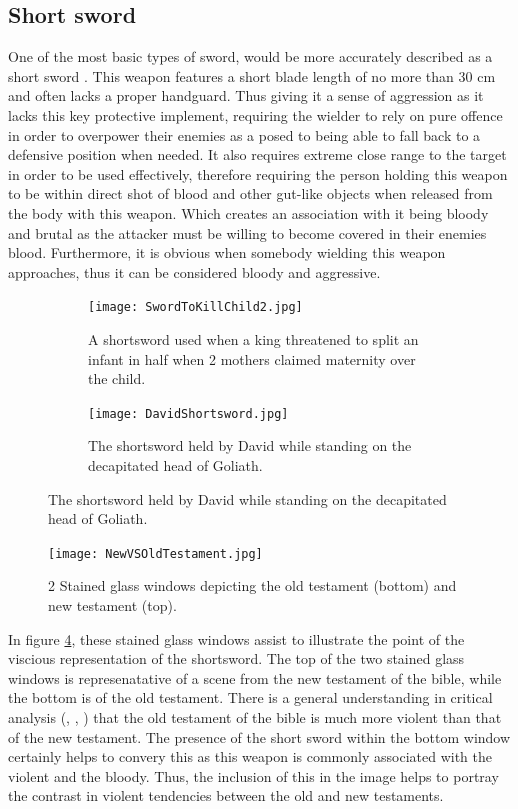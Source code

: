 \documentclass{article}
\begin{document}
\subsection{Short sword} \label{shortSwordSymbol}
One of the most basic types of sword, would be more accurately described as a short sword \parencite{mcnab2010swords}. This weapon features a short blade length of no more than 30 cm and often lacks a proper handguard. Thus giving it a sense of aggression as it lacks this key protective implement, requiring the wielder to rely on pure offence in order to overpower their enemies as a posed to being able to fall back to a defensive position when needed. It also requires extreme close range to the target in order to be used effectively, therefore requiring the person holding this weapon to be within direct shot of blood and other gut-like objects when released from the body with this weapon. Which creates an association with it being bloody and brutal as the attacker must be willing to become covered in their enemies blood. Furthermore, it is obvious when somebody wielding this weapon approaches, thus it can be considered bloody and aggressive.

\begin{figure}[h]
    \centering
    \caption{A collection of shortswords being used in brutish circumstances}
    \begin{subfigure}{0.3\textwidth}
        \texttt{[image: SwordToKillChild2.jpg]}
        \caption{A shortsword used when a king threatened to split an infant in half when 2 mothers claimed maternity over the child.}
        \label{fig:killChild}
    \end{subfigure}
    \begin{subfigure}{0.3\textwidth}
        \texttt{[image: DavidShortsword.jpg]}
        \caption{The shortsword held by David while standing on the decapitated head of Goliath.}
        \label{fig:goliathDead}
    \end{subfigure}
    \label{fig:shortswords}
\end{figure}

\begin{figure}[H]
    \centering
    \texttt{[image: NewVSOldTestament.jpg]}
    \caption{2 Stained glass windows depicting the old testament (bottom) and new testament (top).}
    \label{fig:shortswordsTestament}
\end{figure}

In figure \ref{fig:shortswordsTestament}, these stained glass windows assist to illustrate the point of the viscious representation of the shortsword. The top of the two stained glass windows is represenatative of a scene from the new testament of the bible, while the bottom is of the old testament. There is a general understanding in critical analysis (\parencite{fretheim2004god}, \parencite{lilly2012war}, \parencite{creach2016violence}) that the old testament of the bible is much more violent than that of the new testament. The presence of the short sword within the bottom window certainly helps to convery this as this weapon is commonly associated with the violent and the bloody. Thus, the inclusion of this in the image helps to portray the contrast in violent tendencies between the old and new testaments.
\end{document}
